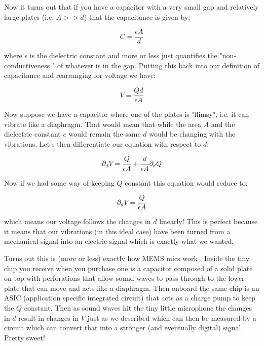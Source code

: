 \documentclass[12pt,a6paper]{book}
\begin{document}
Now it turns out that if you have a capacitor with a very small gap and relatively large plates (i.e. $A >> d$) that the capacitance is given by:

\begin{equation}
C = \frac{\epsilon A}{d}
\end{equation}

where $\epsilon$ is the dielectric constant and more or less just quantifies the "non-conductiveness " of whatever is in the gap. Putting this back into our definition of capacitance and rearranging for voltage we have:

\begin{equation}
V=\frac{Qd}{\epsilon A}
\end{equation}

Now suppose we have a capacitor where one of the plates is "flimsy", i.e. it can vibrate like a diaphragm. That would mean that while the area $A$ and the dielectric constant $e$ would remain the same $d$ would be changing with the vibrations. Let's then differentiate our equation with respect to $d$:

\begin{equation}
\partial_d V = \frac{Q}{\epsilon A} + \frac{d}{\epsilon A}\partial_d Q
\end{equation}

Now if we had some way of keeping $Q$ constant this equation would reduce to:

\begin{equation}
\partial_d V = \frac{Q}{\epsilon A}
\end{equation}

which means our voltage follows the changes in $d$ linearly! This is perfect because it means that our vibrations (in this ideal case) have been turned from a mechanical signal into an electric signal which is exactly what we wanted. 

Turns out this is (more or less) exactly how MEMS mics work \cite{afox}. Inside the tiny chip you receive when you purchase one is a capacitor composed of a solid plate on top with perforations that allow sound waves to pass through to the lower plate that can move and acts like a diaphragm. Then onboard the same chip is an ASIC (application specific integrated circuit) that acts as a charge pump to keep the $Q$ constant. Then as sound waves hit the tiny little microphone the changes in $d$ result in changes in $V$ just as we described which can then be measured by a circuit which can convert that into a stronger (and eventually digital) signal. Pretty sweet!
\end{document}
